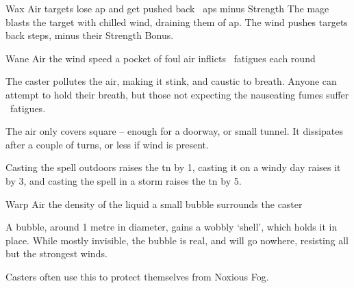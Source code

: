   {}%
  {Wax}%
  {Air}%
  {}%
  {targets lose  \gls{ap} and get pushed back ~\glspl{ap} minus Strength}%
  {
    The mage blasts the target with chilled wind, draining them of  \gls{ap}.
    The wind pushes targets back  steps, minus their Strength Bonus.
  }

  {}%
  {Wane}%
  {Air}%
  {the wind speed}%
  {a pocket of foul air inflicts ~\glspl{fatigue} each round}%
  {
    The caster pollutes the air, making it stink, and caustic to breath.
    Anyone can attempt to hold their breath, but those not expecting the nauseating fumes suffer ~\glspl{fatigue}.

    The air only covers  square -- enough for a doorway, or small tunnel.
    It dissipates after a couple of turns, or less if wind is present.

    Casting the spell outdoors raises the \gls{tn} by 1, casting it on a windy day raises it by 3, and casting the spell in a storm raises the \gls{tn} by 5.
  }

  {}%
  {Warp}%
  {Air}%
  {the density of the liquid}%
  {a small bubble surrounds the caster}%
  {
    A bubble, around 1 metre in diameter, gains a wobbly `shell', which holds it in place.
    While mostly invisible, the bubble is real, and will go nowhere, resisting all but the strongest winds.

    Casters often use this to protect themselves from Noxious Fog.
  }


